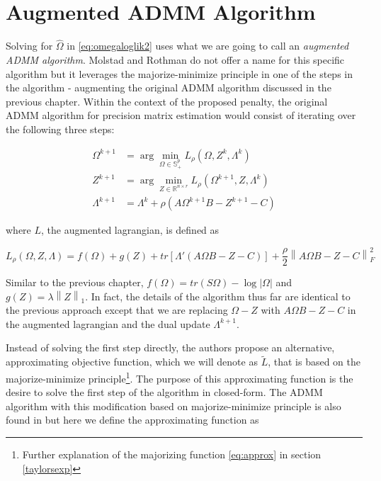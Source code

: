 \documentclass[11pt,]{report}
\theoremstyle{definition}
\theoremstyle{definition}
\theoremstyle{definition}
\theoremstyle{remark}
\begin{document}
\hypertarget{augmented-admm-algorithm}{%
\section{Augmented ADMM Algorithm}\label{augmented-admm-algorithm}}

Solving for \(\hat{\Omega}\) in \eqref{eq:omegaloglik2} uses what we are going to call an \emph{augmented ADMM algorithm}. Molstad and Rothman do not offer a name for this specific algorithm but it leverages the majorize-minimize principle in one of the steps in the algorithm - augmenting the original ADMM algorithm discussed in the previous chapter. Within the context of the proposed penalty, the original ADMM algorithm for precision matrix estimation would consist of iterating over the following three steps:

\begin{equation}
\begin{split}
  \Omega^{k + 1} &= \arg\min_{\Omega \in \mathbb{S}_{+}^{p}}L_{\rho}(\Omega, Z^{k}, \Lambda^{k}) \\
  Z^{k + 1} &= \arg\min_{Z \in \mathbb{R}^{n \times r}}L_{\rho}(\Omega^{k + 1}, Z, \Lambda^{k}) \\
  \Lambda^{k + 1} &= \Lambda^{k} + \rho\left(A\Omega^{k + 1}B - Z^{k + 1} - C \right)
\end{split}
\label{eq:augmentedprecision}
\end{equation}

where \(L\), the augmented lagrangian, is defined as

\begin{equation}
L_{\rho}(\Omega, Z, \Lambda) = f\left(\Omega\right) + g\left(Z\right) + tr\left[\Lambda '\left(A\Omega B - Z - C\right)\right] + \frac{\rho}{2}\left\|A\Omega B - Z - C\right\|_{F}^{2}
\label{eq:auglagrange3}
\end{equation}

Similar to the previous chapter, \(f\left(\Omega\right) = tr\left(S\Omega\right) - \log\left|\Omega\right|\) and \(g\left(Z\right) = \lambda\left\|Z\right\|_{1}\). In fact, the details of the algorithm thus far are identical to the previous approach except that we are replacing \(\Omega - Z\) with \(A\Omega B - Z - C\) in the augmented lagrangian and the dual update \(\Lambda^{k + 1}\).

Instead of solving the first step directly, the authors propose an alternative, approximating objective function, which we will denote as \(\tilde{L}\), that is based on the majorize-minimize principle\footnote{Further explanation of the majorizing function \eqref{eq:approx} in section \ref{taylorsexp}}. The purpose of this approximating function is the desire to solve the first step of the algorithm in closed-form. The ADMM algorithm with this modification based on majorize-minimize principle is also found in \citet{lange2016mm} but here we define the approximating function as
\end{document}

